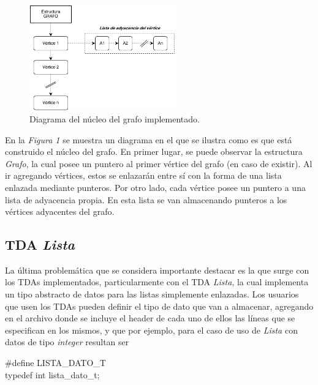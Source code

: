 \documentclass{article}
\begin{document}
\begin{figure}[h]
	\centering
	\includegraphics[width=0.55959299\textwidth]{images/diagrama01.png}
	\medskip
	\caption{Diagrama del núcleo del grafo implementado.}
\end{figure}
\medskip
	

	En la \textit{Figura 1} se muestra un diagrama en el que se ilustra como es que está construido el núcleo del grafo. En primer lugar, se puede observar la estructura \textit{Grafo}, la cual posee un puntero al primer vértice del grafo (en caso de existir). Al ir agregando vértices, estos se enlazarán entre sí con la forma de una lista enlazada mediante punteros. Por otro lado, cada vértice posee un puntero a una lista de adyacencia propia. En esta lista se van almacenando punteros a los vértices adyacentes del grafo.
\bigskip



\subsection{TDA \textit{Lista}}

	La última problemática que se considera importante destacar es la que surge con los TDAs implementados, particularmente con el TDA \textit{Lista}, la cual implementa un tipo abstracto de datos para las listas simplemente enlazadas. Los usuarios que usen los TDAs pueden definir el tipo de dato que van a almacenar, agregando en el archivo donde se incluye el header de cada uno de ellos las líneas que se especifican en los mismos, y que por ejemplo, para el caso de uso de \textit{Lista} con datos de tipo \textit{integer} resultan ser
\bigskip

	{\ttfamily\footnotesize
\indent \#define LISTA\_DATO\_T\\
\indent typedef int lista\_dato\_t;\\}
\end{document}
